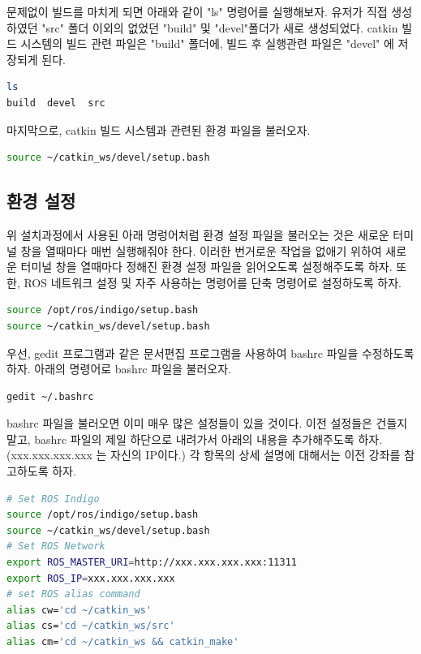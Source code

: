 문제없이 빌드를 마치게 되면 아래와 같이 "ls" 명령어를 실행해보자. 유저가 직접 생성하였던 "src" 폴더 이외의 없었던 "build" 및 "devel"폴더가 새로 생성되었다. catkin 빌드 시스템의 빌드 관련 파일은 "build" 폴더에, 빌드 후 실행관련 파일은 "devel" 에 저장되게 된다.

\begin{lstlisting}[language=bash]
ls
build  devel  src
\end{lstlisting}

마지막으로, catkin 빌드 시스템과 관련된 환경 파일을 불러오자. 

\begin{lstlisting}[language=bash]
source ~/catkin_ws/devel/setup.bash
\end{lstlisting}

\subsection{환경 설정}

위 설치과정에서 사용된 아래 명렁어처럼 환경 설정 파일을 불러오는 것은 새로운 터미널 창을 열때마다 매번 실행해줘야 한다. 이러한 번거로운 작업을 없애기 위하여 새로운 터미널 창을 열때마다 정해진 환경 설정 파일을 읽어오도록 설정해주도록 하자. 또한, ROS 네트워크 설정 및 자주 사용하는 명령어를 단축 명령어로 설정하도록 하자.

\begin{lstlisting}[language=bash]
source /opt/ros/indigo/setup.bash
source ~/catkin_ws/devel/setup.bash
\end{lstlisting}

우선, gedit 프로그램과 같은 문서편집 프로그램을 사용하여 bashrc 파일을 수정하도록 하자. 아래의 명령어로 bashrc 파일을 불러오자.

\begin{lstlisting}[language=bash]
gedit ~/.bashrc
\end{lstlisting}

bashrc 파일을 불러오면 이미 매우 많은 설정들이 있을 것이다. 이전 설정들은 건들지 말고, bashrc 파일의 제일 하단으로 내려가서 아래의 내용을 추가해주도록 하자. (xxx.xxx.xxx.xxx 는 자신의 IP이다.) 각 항목의 상세 설명에 대해서는 이전 강좌를 참고하도록 하자.

\begin{lstlisting}[language=bash]
# Set ROS Indigo
source /opt/ros/indigo/setup.bash
source ~/catkin_ws/devel/setup.bash
# Set ROS Network
export ROS_MASTER_URI=http://xxx.xxx.xxx.xxx:11311
export ROS_IP=xxx.xxx.xxx.xxx
# set ROS alias command
alias cw='cd ~/catkin_ws'
alias cs='cd ~/catkin_ws/src'
alias cm='cd ~/catkin_ws && catkin_make'
\end{lstlisting}

